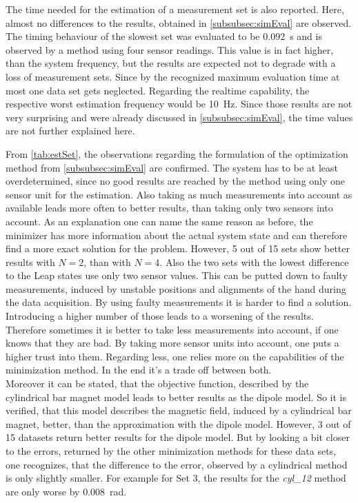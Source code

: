 The time needed for the estimation of a measurement set is also reported. Here, almost no differences to the results, obtained in \ref{subsubsec:simEval} are observed. The timing behaviour of the slowest set was evaluated to be \SI{0.092}{\second} and is observed by a method using four sensor readings. This value is in fact higher, than the system frequency, but the results are expected not to degrade with a loss of measurement sets. Since by the recognized maximum evaluation time at most one data set gets neglected. Regarding the realtime capability, the respective worst estimation frequency would be \SI{10}{\Hz}. Since those results are not very surprising and were already discussed in \ref{subsubsec:simEval}, the time values are not further explained here.

From \ref{tab:estSet}, the observations regarding the formulation of the optimization method from \ref{subsubsec:simEval} are confirmed. The system has to be at least overdetermined, since no good results are reached by the method using only one sensor unit for the estimation. Also taking as much measurements into account as available leads more often to better results, than taking only two sensors into account. As an explanation one can name the same reason as before, the minimizer has more information about the actual system state and can therefore find a more exact solution for the problem. However, 5 out of 15 sets show better results with $ N = 2 $, than with $ N = 4 $. Also the two sets with the lowest difference to the Leap states use only two sensor values. This can be putted down to faulty measurements, induced by unstable positions and alignments of the hand during the data acquisition. By using faulty measurements it is harder to find a solution. Introducing a higher number of those leads to a worsening of the results. Therefore sometimes it is better to take less measurements into account, if one knows that they are bad. By taking more sensor units into account, one puts a higher trust into them. Regarding less, one relies more on the capabilities of the minimization method. In the end it's a trade off between both.\\
Moreover it can be stated, that the objective function, described by the cylindrical bar magnet model leads to better results as the dipole model. So it is  verified, that this model describes the magnetic field, induced by a cylindrical bar magnet, better, than the approximation with the dipole model. However, 3 out of 15 datasets return better results for the dipole model. But by looking a bit closer to the errors, returned by the other minimization methods for these data sets, one recognizes, that the difference to the error, observed by a cylindrical method is only slightly smaller. For example for Set 3, the results for the \emph{cyl\_12} method are only worse by \SI{0.008}{\radian}. \\
